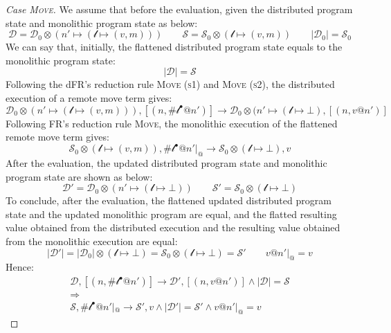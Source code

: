 \begin{proof}[Case \textsc{\emph{Move}}]
We assume that before the evaluation, given the distributed program state and monolithic program state as below:
\[\mathcal{D} = \mathcal{D}_0 \otimes (n' \mapsto (\mathscr{l}\mapsto (v, m)))\quad\quad
\mathcal{S} = \mathcal{S}_0 \otimes (\mathscr{l} \mapsto (v, m))\quad\quad
|\mathcal{D}_0| = \mathcal{S}_0\]
We can say that, initially, the flattened distributed program state equals to the monolithic program state:
\[|\mathcal{D}| = \mathcal{S}\]
Following the dFR's reduction rule \textsc{Move (s1)} and \textsc{Move (s2)}, the distributed execution of a remote move term gives:
\[\mathcal{D}_0 \otimes (n' \mapsto (\mathscr{l} \mapsto (v,m))) , [(n, \#\mathscr{l}^\bullet@n')] \longrightarrow \mathcal{D}_0 \otimes (n' \mapsto (\mathscr{l} \mapsto \bot), [(n, v@n')]\]
Following FR's reduction rule \textsc{Move}, the monolithic execution of the flattened remote move term gives:
\[\mathcal{S}_0 \otimes (\mathscr{l} \mapsto (v, m)), \#\mathscr{l}^\bullet@n'|_@ \longrightarrow \mathcal{S}_0 \otimes (\mathscr{l} \mapsto \bot), v\]
After the evaluation, the updated distributed program state and monolithic program state are shown as below:
\[\mathcal{D}' = \mathcal{D}_0 \otimes (n' \mapsto (\mathscr{l} \mapsto \bot)) \quad\quad \mathcal{S}' = \mathcal{S}_0 \otimes (\mathscr{l} \mapsto \bot)\]
To conclude, after the evaluation, the flattened updated distributed program state and the updated monolithic program are equal, and the flatted resulting value obtained from the distributed execution and the resulting value obtained from the monolithic execution are equal:
\[|\mathcal{D}'| = |\mathcal{D}_0| \otimes (\mathscr{l} \mapsto \bot) = \mathcal{S}_0 \otimes (\mathscr{l} \mapsto \bot) = \mathcal{S}' \quad\quad v@n'|_@ = v\]
Hence:
\begin{gather*}
\mathcal{D}, [(n, \#\mathscr{l}^\bullet@n')] \longrightarrow \mathcal{D'}, [(n, v@n')] \land |\mathcal{D}| = \mathcal{S} \\\Rightarrow\\ \mathcal{S},  \#\mathscr{l}^\bullet@n'|_@ \longrightarrow \mathcal{S'}, v \land |\mathcal{D}'| = \mathcal{S}' \land v@n'|_@ = v
\end{gather*}

\end{proof}
